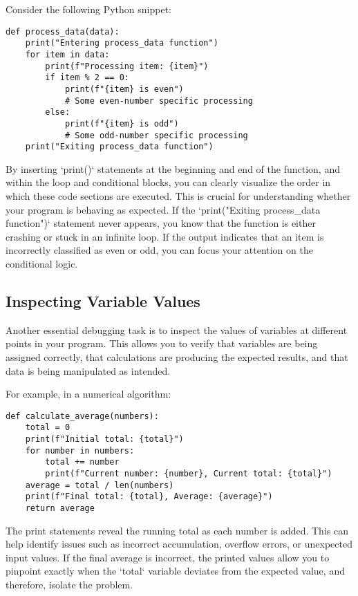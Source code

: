\documentclass{article}
\begin{document}
Consider the following Python snippet:

\begin{verbatim}
def process_data(data):
    print("Entering process_data function")
    for item in data:
        print(f"Processing item: {item}")
        if item % 2 == 0:
            print(f"{item} is even")
            # Some even-number specific processing
        else:
            print(f"{item} is odd")
            # Some odd-number specific processing
    print("Exiting process_data function")
\end{verbatim}

By inserting `print()` statements at the beginning and end of the function, and within the loop and conditional blocks, you can clearly visualize the order in which these code sections are executed. This is crucial for understanding whether your program is behaving as expected. If the `print("Exiting process_data function")` statement never appears, you know that the function is either crashing or stuck in an infinite loop. If the output indicates that an item is incorrectly classified as even or odd, you can focus your attention on the conditional logic.

\subsection*{Inspecting Variable Values}

Another essential debugging task is to inspect the values of variables at different points in your program. This allows you to verify that variables are being assigned correctly, that calculations are producing the expected results, and that data is being manipulated as intended.

For example, in a numerical algorithm:

\begin{verbatim}
def calculate_average(numbers):
    total = 0
    print(f"Initial total: {total}")
    for number in numbers:
        total += number
        print(f"Current number: {number}, Current total: {total}")
    average = total / len(numbers)
    print(f"Final total: {total}, Average: {average}")
    return average
\end{verbatim}

The print statements reveal the running total as each number is added. This can help identify issues such as incorrect accumulation, overflow errors, or unexpected input values.  If the final average is incorrect, the printed values allow you to pinpoint exactly when the `total` variable deviates from the expected value, and therefore, isolate the problem.
\end{document}
